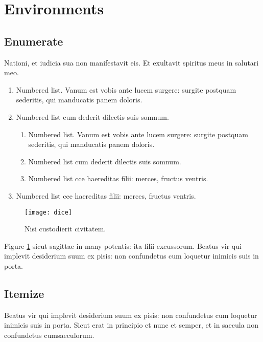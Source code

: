 \documentclass[linenumber]{jdsart}
\theoremstyle{plain}
\theoremstyle{remark}
\theoremstyle{definition}
\begin{document}
\section{Environments}

\subsection{Enumerate}

Nationi, et iudicia sua non manifestavit eis. Et exultavit spiritus meus
in salutari meo.
\begin{enumerate}
\item Numbered list. Vanum est vobis ante lucem surgere: surgite
postquam sederitis, qui manducatis panem doloris.

\item Numbered list cum dederit dilectis suis somnum.

\begin{enumerate}
\item Numbered list. Vanum est vobis ante lucem surgere: surgite
postquam sederitis, qui manducatis panem doloris.

\item Numbered list cum dederit dilectis suis somnum.

\item Numbered list cce haereditas filii: merces, fructus ventris.
\end{enumerate}

\item Numbered list cce haereditas filii: merces, fructus ventris.
\end{enumerate}


\begin{figure}[t]
\texttt{[image: dice]}%
\caption{Nisi custodierit civitatem.}\label{f2}
\end{figure}

Figure \ref{f2} sicut sagittae in many potentis: ita filii excussorum. Beatus vir qui
implevit desiderium suum ex pisis: non confundetus cum loquetur inimicis
suis in porta.

\subsection{Itemize}

Beatus vir qui implevit desiderium
suum ex pisis: non confundetus cum loquetur inimicis suis in porta.
Sicut erat in principio et nunc et semper, et in saecula non
confundetus cumsaeculorum.
\end{document}
